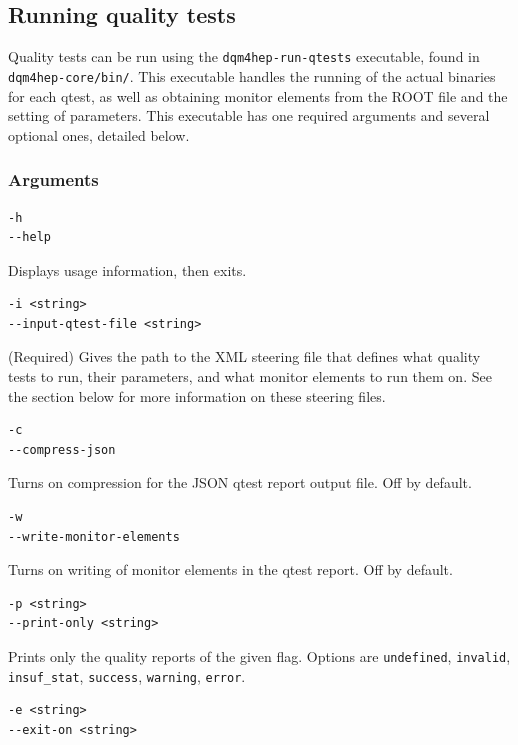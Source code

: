 \subsection{Running quality tests}

Quality tests can be run using the \texttt{dqm4hep-run-qtests} executable, found in \texttt{dqm4hep-core/bin/}. This executable handles the running of the actual binaries for each qtest, as well as obtaining monitor elements from the ROOT file and the setting of parameters. This executable has one required arguments and several optional ones, detailed below. 

\subsubsection{Arguments}

\begin{verbatim}
-h
--help
\end{verbatim}

Displays usage information, then exits.

\begin{verbatim}
-i <string>
--input-qtest-file <string>
\end{verbatim}

(Required) Gives the path to the XML steering file that defines what quality tests to run, their parameters, and what monitor elements to run them on. See the section below for more information on these steering files.

\begin{verbatim}
-c
--compress-json
\end{verbatim}

Turns on compression for the JSON qtest report output file. Off by default.

\begin{verbatim}
-w
--write-monitor-elements
\end{verbatim}

Turns on writing of monitor elements in the qtest report. Off by default.

\begin{verbatim}
-p <string>
--print-only <string>
\end{verbatim}

Prints only the quality reports of the given flag. Options are \texttt{undefined}, \texttt{invalid}, \texttt{insuf_stat}, \texttt{success}, \texttt{warning}, \texttt{error}.

\begin{verbatim}
-e <string>
--exit-on <string>
\end{verbatim}

